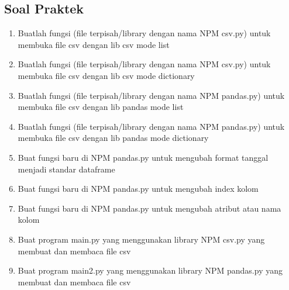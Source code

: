 \subsection{Soal Praktek}
\begin{enumerate}

\item Buatlah fungsi (file terpisah/library dengan nama NPM csv.py) untuk membuka file csv dengan lib csv mode list
%

\item Buatlah fungsi (file terpisah/library dengan nama NPM csv.py) untuk membuka file csv dengan lib csv mode dictionary
%

\item Buatlah fungsi (file terpisah/library dengan nama NPM pandas.py) untuk membuka file csv dengan lib pandas mode list
%

\item Buatlah fungsi (file terpisah/library dengan nama NPM pandas.py) untuk membuka file csv dengan lib pandas mode dictionary
%

\item Buat fungsi baru di NPM pandas.py untuk mengubah format tanggal menjadi standar dataframe
%

\item Buat fungsi baru di NPM pandas.py untuk mengubah index kolom
%

\item Buat fungsi baru di NPM pandas.py untuk mengubah atribut atau nama kolom
%

\item Buat program main.py yang menggunakan library NPM csv.py yang membuat dan membaca file csv
%

\item Buat program main2.py yang menggunakan library NPM pandas.py yang membuat dan membaca file csv
%
\end{enumerate}

